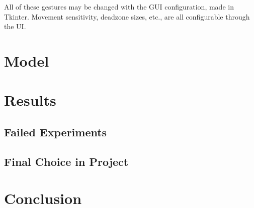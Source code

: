 \documentclass{article}
\begin{document}
All of these gestures may be changed with the GUI configuration, made in Tkinter. Movement sensitivity, deadzone sizes, etc., are all configurable through the UI.

\section{Model}


\section{Results}
\subsection{Failed Experiments}
\subsection{Final Choice in Project}
\section{Conclusion}




\pagebreak
\nocite{*} %
\printbibliography %
\end{document}
